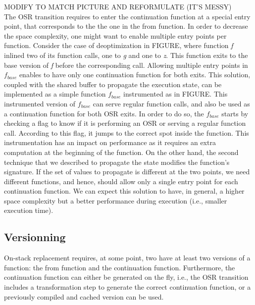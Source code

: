 
MODIFY TO MATCH PICTURE AND REFORMULATE (IT'S MESSY)\\

The OSR transition requires to enter the continuation function at a special entry point, that corresponds to the the one in the from function.
In order to decrease the space complexity, one might want to enable multiple entry points per function.
Consider the case of deoptimization in FIGURE, where function \textit{f} inlined two of its function calls, one to \textit{g} and one to \textit{z}.
This function exits to the base version of \textit{f} before the corresponding call.
Allowing multiple entry points in $f_{base}$ enables to have only one continuation function for both exits.
This solution, coupled with the shared buffer to propagate the execution state, can be implemented as a simple function $f_{base}$ instrumented as in FIGURE.
This instrumented version of $f_{base}$ can serve regular function calls, and also be used as a continuation function for both OSR exits.
In order to do so, the $f_{base}$ starts by checking a flag to know if it is performing an OSR or serving a regular function call. 
According to this flag, it jumps to the correct spot inside the function.
This instrumentation has an impact on performance as it requires an extra computation at the beginning of the function. 
On the other hand, the second technique that we described to propagate the state modifies the function's signature.
If the set of values to propagate is different at the two points, we need different functions, and hence, should allow only a single entry point for each continuation function.
We can expect this solution to have, in general, a higher space complexity but a better performance  during execution (i.e., smaller execution time).\\

\subsection{Versionning}
On-stack replacement requires, at some point, two have at least two versions of a function: the from function and the continuation function.
Furthermore, the continuation function can either be generated on the fly, i.e., the OSR transition includes a transformation step to generate the correct continuation function, or a previously compiled and cached version can be used.

